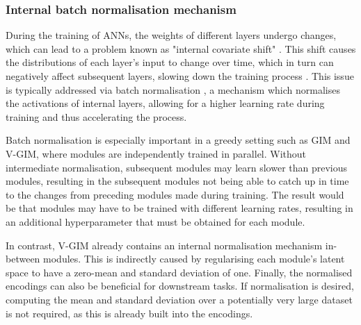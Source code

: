 
	
	\subsubsection{Internal batch normalisation mechanism} \label{cha:vgim_batch_norm}
		During the training of ANNs, the weights of different layers undergo changes, which can lead to a problem known as "internal covariate shift" \citep{ioffeBatchNormalizationAccelerating2015}. This shift causes the distributions of each layer's input to change over time, which in turn can negatively affect subsequent layers, slowing down the training process \citep{bjorckUnderstandingBatchNormalization2018, lecunEfficientBackProp1998}. This issue is typically addressed via batch normalisation \citep{santurkarHowDoesBatch2018, bjorckUnderstandingBatchNormalization2018}, a mechanism which normalises the activations of internal layers, allowing for a higher learning rate during training and thus accelerating the process.
			
		Batch normalisation is especially important in a greedy setting such as GIM and V-GIM, where modules are independently trained in parallel. Without intermediate normalisation, subsequent modules may learn slower than previous modules, resulting in the subsequent modules not being able to catch up in time to the changes from preceding modules made during training. The result would be that modules may have to be trained with different learning rates, resulting in an additional hyperparameter that must be obtained for each module.
		
		In contrast, V-GIM already contains an internal normalisation mechanism in-between modules. This is indirectly caused by regularising each module's latent space to have a zero-mean and standard deviation of one. Finally, the normalised encodings can also be beneficial for downstream tasks. If normalisation is desired, computing the mean and standard deviation over a potentially very large dataset is not required, as this is already built into the encodings.


